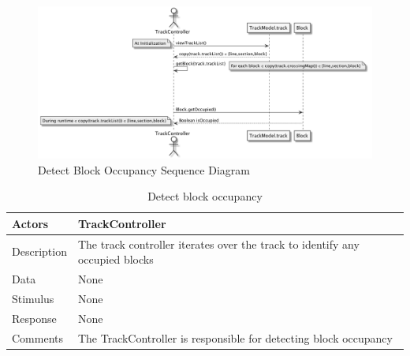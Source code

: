 \documentclass[]{article}
\begin{document}
\begin{figure}[H]
	\centering
	\includegraphics[width=\textwidth]{detectOccupied.png}
	\caption{Detect Block Occupancy Sequence Diagram}
\end{figure}
\begin{table}[H]
	\centering
	\caption{Detect block occupancy}
	\begin{tabular}{|l|l|}
		\hline
		Actors & \parbox[t]{10cm}{TrackController} \\ \hline
		Description & \parbox[t]{10cm}{The track controller iterates over the track to identify any occupied blocks} \\ \hline
		Data &  \parbox[t]{10cm}{None} \\ \hline
		Stimulus &  \parbox[t]{10cm}{None} \\ \hline
		Response & \parbox[t]{10cm}{None}\\ \hline
		Comments & \parbox[t]{10cm}{The TrackController is responsible for detecting block occupancy}  \\ \hline
	\end{tabular}
\end{table}
\end{document}
